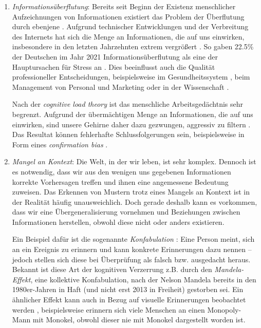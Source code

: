 \begin{enumerate}
	\item \emph{Informationsüberflutung}: Bereits seit Beginn der Existenz menschlicher Aufzeichnungen von Informationen existiert das Problem der Überflutung durch ebenjene \citep{bawden2020information}.
	Aufgrund technischer Entwicklungen und der Verbreitung des Internets hat sich die Menge an Informationen, die auf uns einwirken, insbesondere in den letzten Jahrzehnten extrem vergrößert \citep{siegler2010every}.
	So gaben 22.5\% der Deutschen im Jahr 2021 Informationsüberflutung als eine der Hauptursachen für Stress an \citep{meyer2021entspann}.
	Dies beeinflusst auch die Qualität professioneller Entscheidungen, beispielsweise im Gesundheitssystem \citep{hall2004information}, beim Management von Personal \citep{volnhals2008information} und Marketing \citep{meyer1998information} oder in der Wissenschaft \citep{landhuis2016scientific}.
	
	Nach der \emph{cognitive load theory} \citep{atkinson1968human} ist das menschliche Arbeitsgedächtnis sehr begrenzt.
	Aufgrund der übermächtigen Menge an Informationen, die auf uns einwirken, sind unsere Gehirne daher dazu gezwungen, aggressiv zu filtern \citep{savolainen2007filtering}.
	Das Resultat können fehlerhafte Schlussfolgerungen sein, beispielsweise in Form eines \emph{confirmation bias} \citep{goette2019information}.
	
	\item \emph{Mangel an Kontext}: Die Welt, in der wir leben, ist sehr komplex.
	Dennoch ist es notwendig, dass wir aus den wenigen uns gegebenen Informationen korrekte Vorhersagen treffen und ihnen eine angemessene Bedeutung zuweisen.
	Das Erkennen von Mustern trotz eines Mangels an Kontext ist in der Realität häufig unausweichlich.
	Doch gerade deshalb kann es vorkommen, dass wir eine Übergeneralisierung vornehmen und Beziehungen zwischen Informationen herstellen, obwohl diese nicht oder anders existieren.
	
	Ein Beispiel dafür ist die sogenannte \emph{Konfabulation} \citep{gilboa2002cognitive}:
	Eine Person meint, sich an ein Ereignis zu erinnern und kann konkrete Erinnerungen dazu nennen -- jedoch stellen sich diese bei Überprüfung als falsch bzw. ausgedacht heraus.
	Bekannt ist diese Art der kognitiven Verzerrung z.B. durch den \emph{Mandela-Effekt}, eine kollektive Konfabulation, nach der Nelson Mandela bereits in den 1980er-Jahren in Haft (und nicht erst 2013 in Freiheit) gestorben sei.
	Ein ähnlicher Effekt kann auch in Bezug auf visuelle Erinnerungen beobachtet werden \citep{prasad2022visual}, beispielsweise erinnern sich viele Menschen an einen Monopoly-Mann mit Monokel, obwohl dieser nie mit Monokel dargestellt worden ist.
	

\end{enumerate}
